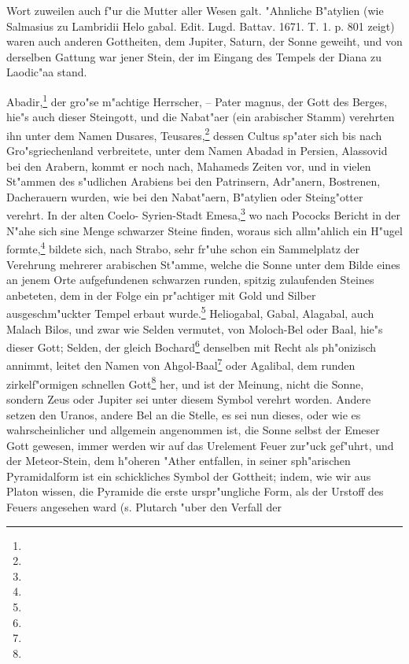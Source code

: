 \documentclass[a4paper, 11pt, oneside, polutonikogreek, german]{article}
\begin{document}
Wort zuweilen auch f"ur die Mutter aller Wesen galt. "Ahnliche B"atylien (wie Salmasius zu Lambridii Helo gabal. Edit. Lugd. Battav. 1671. T. 1. p. 801 zeigt) waren auch anderen Gottheiten, dem Jupiter, Saturn, der Sonne geweiht, und von derselben Gattung war jener Stein, der im Eingang des Tempels der Diana zu Laodic"aa stand.

Abadir,\footnote{} der gro"se m"achtige Herrscher, -- Pater magnus, der Gott des Berges, hie"s auch dieser Steingott, und die Nabat"aer (ein arabischer Stamm) verehrten ihn unter dem Namen Dusares, Teusares,\footnote{} dessen Cultus sp"ater sich bis nach Gro"sgriechenland verbreitete, unter dem Namen Abadad in Persien, Alassovid bei den Arabern, kommt er noch nach, Mahameds Zeiten vor, und in vielen St"ammen des s"udlichen Arabiens bei den Patrinsern, Adr"anern, Bostrenen, Dacherauern wurden, wie bei den Nabat"aern, B"atylien oder Steing"otter verehrt. In der alten Coelo- Syrien-Stadt Emesa,\footnote{} wo nach Pococks Bericht in der N"ahe sich sine Menge schwarzer Steine finden, woraus sich allm"ahlich ein H"ugel formte,\footnote{} bildete sich, nach Strabo, sehr fr"uhe schon ein Sammelplatz der Verehrung mehrerer arabischen St"amme, welche die Sonne unter dem Bilde eines an jenem Orte aufgefundenen schwarzen runden, spitzig zulaufenden Steines anbeteten, dem in der Folge ein pr"achtiger mit Gold und Silber ausgeschm"uckter Tempel erbaut wurde.\footnote{} Heliogabal, Gabal, Alagabal, auch Malach Bilos, und zwar wie Selden vermutet, von Moloch-Bel oder Baal, hie"s dieser Gott; Selden, der gleich Bochard\footnote{} denselben mit Recht als ph"onizisch annimmt, leitet den Namen von Ahgol-Baal\footnote{} oder Agalibal, dem runden zirkelf"ormigen schnellen Gott\footnote{} her, und ist der Meinung, nicht die Sonne, sondern Zeus oder Jupiter sei unter diesem Symbol verehrt worden. Andere setzen den Uranos, andere Bel an die Stelle, es sei nun dieses, oder wie es wahrscheinlicher und allgemein angenommen ist, die Sonne selbst der Emeser Gott gewesen, immer werden wir auf das Urelement Feuer zur"uck gef"uhrt, und der Meteor-Stein, dem h"oheren "Ather entfallen, in seiner sph"arischen Pyramidalform ist ein schickliches Symbol der Gottheit; indem, wie wir aus Platon wissen, die Pyramide die erste urspr"ungliche Form, als der Urstoff des Feuers angesehen ward (s. Plutarch "uber den Verfall der 
\end{document}
